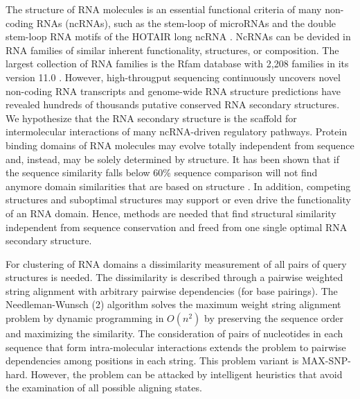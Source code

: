 \documentclass[a4paper,twoside]{article}
\begin{document}
\noindent The structure of RNA molecules is an essential functional criteria of
many non-coding RNAs (ncRNAs), such as the stem-loop of microRNAs and the double
stem-loop RNA motifs of the HOTAIR long ncRNA \cite{Gupta20393566}. NcRNAs can
be devided in RNA families of similar inherent functionality, structures, or
composition. The largest collection of RNA families is the Rfam database with
2,208 families in its version 11.0 \cite{Burge23125362}. However, high-througput
sequencing continuously uncovers novel non-coding RNA transcripts and
genome-wide RNA structure predictions have revealed hundreds of thousands
putative conserved RNA secondary structures. We hypothesize that the RNA
secondary structure is the scaffold for intermolecular interactions of many
ncRNA-driven regulatory pathways. Protein binding domains of RNA molecules may
evolve totally independent from sequence and, instead, may be solely determined
by structure. It has been shown that if the sequence similarity falls below 60\%
sequence comparison will not find anymore domain similarities that are based on
structure \cite{Gardner15860779}. In addition, competing structures and
suboptimal structures may support or even drive the functionality of an RNA
domain. Hence, methods are needed that find structural similarity independent
from sequence conservation and freed from one single optimal RNA secondary
structure.

For clustering of RNA domains a dissimilarity measurement of all pairs of query
structures is needed. The dissimilarity is described through a pairwise weighted
string alignment with arbitrary pairwise dependencies (for base pairings). The
Needleman-Wunsch (2) algorithm solves the maximum weight string alignment
problem by dynamic programming in $O(n^2)$ by preserving the sequence order and
maximizing the similarity. The consideration of pairs of nucleotides in each
sequence that form intra-molecular interactions extends the problem to pairwise
dependencies among positions in each string. This problem variant is
MAX-SNP-hard. However, the problem can be attacked by intelligent heuristics
that avoid the examination of all possible aligning states.
\end{document}

